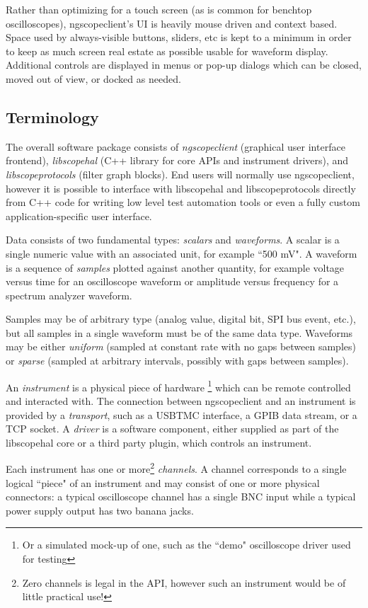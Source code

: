 Rather than optimizing for a touch screen (as is common for benchtop oscilloscopes), ngscopeclient's UI is
heavily mouse driven and context based. Space used by always-visible buttons, sliders, etc is kept to a minimum in
order to keep as much screen real estate as possible usable for waveform display. Additional controls are displayed in
menus or pop-up dialogs which can be closed, moved out of view, or docked as needed.

\subsection{Terminology}

The overall software package consists of \emph{ngscopeclient} (graphical user interface frontend), \emph{libscopehal}
(C++ library for core APIs and instrument drivers), and \emph{libscopeprotocols} (filter graph blocks). End users will
normally use ngscopeclient, however it is possible to interface with libscopehal and libscopeprotocols directly from
C++ code for writing low level test automation tools or even a fully custom application-specific user interface.

Data consists of two fundamental types: \emph{scalars} and \emph{waveforms}. A scalar is a single numeric value with an
associated unit, for example ``500 mV". A waveform is a sequence of \emph{samples} plotted against another quantity, for
example voltage versus time for an oscilloscope waveform or amplitude versus frequency for a spectrum analyzer
waveform.

Samples may be of arbitrary type (analog value, digital bit, SPI bus event, etc.), but all samples in a
single waveform must be of the same data type. Waveforms may be either \emph{uniform} (sampled at constant rate with no
gaps between samples) or \emph{sparse} (sampled at arbitrary intervals, possibly with gaps between samples).

An \emph{instrument} is a physical piece of hardware \footnote{Or a simulated mock-up of one, such as the ``demo"
oscilloscope driver used for testing} which can be remote controlled and interacted with. The connection between
ngscopeclient and an instrument is provided by a \emph{transport}, such as a USBTMC interface, a GPIB data stream, or a
TCP socket. A \emph{driver} is a software component, either supplied as part of the libscopehal core or a third party
plugin, which controls an instrument.

Each instrument has one or more\footnote{Zero channels is legal in the API, however such an instrument would be of
little practical use!} \emph{channels}. A channel corresponds to a single logical ``piece" of an instrument and may
consist of one or more physical connectors: a typical oscilloscope channel has a single BNC input while a typical power
supply output has two banana jacks.

